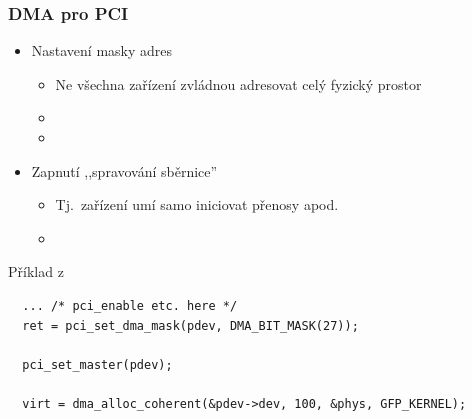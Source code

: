 \begin{frame}[fragile]
  \frametitle{DMA pro PCI}

  \begin{itemize}
    \item Nastavení masky adres
    \begin{itemize}
      \item Ne všechna zařízení zvládnou adresovat celý fyzický prostor
      \item {}
      \item {}
    \end{itemize}

    \pause

    \item Zapnutí ,,spravování sběrnice''
    \begin{itemize}
      \item Tj.\ zařízení umí samo iniciovat přenosy apod.
      \item {}
    \end{itemize}
  \end{itemize}

  \pause

  \begin{block}{Příklad z }
  \begin{lstlisting}
  ... /* pci_enable etc. here */
  ret = pci_set_dma_mask(pdev, DMA_BIT_MASK(27));

  pci_set_master(pdev);

  virt = dma_alloc_coherent(&pdev->dev, 100, &phys, GFP_KERNEL);
  \end{lstlisting}
  \end{block}

\end{frame}

